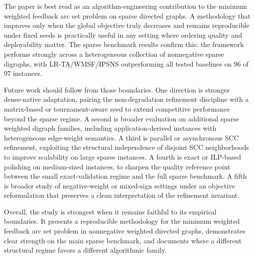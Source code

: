 The paper is best read as an algorithm-engineering contribution to the minimum weighted feedback arc set problem on sparse directed graphs. A methodology that improves only when the global objective truly decreases and remains reproducible under fixed seeds is practically useful in any setting where ordering quality and deployability matter. The sparse benchmark results confirm this: the framework performs strongly across a heterogeneous collection of nonnegative sparse digraphs, with LR-TA/WMSF/IPSNS outperforming all tested baselines on 96 of 97 instances.

Future work should follow from those boundaries. One direction is stronger dense-native adaptation, pairing the non-degradation refinement discipline with a matrix-based or tournament-aware seed to extend competitive performance beyond the sparse regime. A second is broader evaluation on additional sparse weighted digraph families, including application-derived instances with heterogeneous edge-weight semantics. A third is parallel or asynchronous SCC refinement, exploiting the structural independence of disjoint SCC neighborhoods to improve scalability on large sparse instances. A fourth is exact or ILP-based polishing on medium-sized instances, to sharpen the quality reference point between the small exact-validation regime and the full sparse benchmark. A fifth is broader study of negative-weight or mixed-sign settings under an objective reformulation that preserves a clean interpretation of the refinement invariant.

Overall, the study is strongest when it remains faithful to its empirical boundaries. It presents a reproducible methodology for the minimum weighted feedback arc set problem in nonnegative weighted directed graphs, demonstrates clear strength on the main sparse benchmark, and documents where a different structural regime favors a different algorithmic family.
